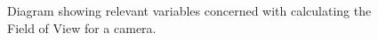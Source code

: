 \begin{figure}[h!]
\begin{tikzpicture}[x=0.75pt,y=0.75pt,yscale=-1,xscale=1]
		
	\end{tikzpicture}
	\caption{Diagram showing relevant variables concerned with calculating the Field of View for a camera.}
	\label{fig:FOV}
\end{figure}
